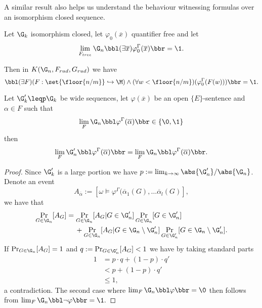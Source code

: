 A similar result also helps us understand the behaviour witnessing formulas over an isomorphism closed sequence.

\begin{thrm}
Let $\G_k$ isomorphism closed, let $\varphi_0(\overline x)$ quantifier free and let 
\[\lim_{F_{tree}}\G_n\bbl(\exists \overline x)\varphi_0^\Gamma(\overline x)\bbr=\1.\]

Then in $K(\G_n,F_{rud},G_{rud})$ we have
\[\bbl(\exists F)(F:\set{\floor{n/m}}\hookrightarrow\M)\land(\forall w<\floor{n/m})(\varphi_0^\Gamma(F(w)))\bbr=\1.\]

\end{thrm}



\begin{lemm}\label{lemmhere}
Let $\G_k'\leqp \G_k$ be wide sequences, let $\varphi(\overline x)$ be an open $\{E\}$-sentence and $\alpha\in F$ such that
\[\lim_{F}\G_n\bbl\varphi^\Gamma(\overline \alpha)\bbr\in\{\0,\1\}\]
then
\[\lim_{F}\G_n'\bbl\varphi^\Gamma(\overline \alpha)\bbr = \lim_{F}\G_n\bbl\varphi^\Gamma(\overline \alpha)\bbr.\]
\end{lemm}
\begin{proof} Since $\G_k'$ is a large portion we have $p:=\lim_{k\to\infty}\abs{\G_n'}/\abs{\G_n}$. Denote an event
\[A_{\overline \alpha}:=[\omega \models \varphi^{\Gamma}(\overline\alpha_1(G),\dots\overline \alpha_l(G)],\]
we have that 
\begin{align}
\Pr_{G\in\G_n}[A_G]&=\Pr_{G\in \G_n}[A_G|G\in\G_n']\Pr_{G\in\G_n}[G\in\G_n']\\
&\phantom{\:=\:}+\Pr_{G\in\G_n}[A_G|G\in\G_n\setminus\G_n']\Pr_{G\in\G_n'}[G\in\G_n \setminus \G_n'].
\end{align}
If $\Pr_{G\in\G_n}[A_G]=1$ and $q:=\Pr_{G\in\G_n'}[A_G]<1$ we have by taking standard parts
\begin{align}
1&=p\cdot q + (1-p)\cdot q'\\
&< p + (1-p)\cdot q'\\
&\leq1,
\end{align}
a contradiction. The second case where $\lim_F\G_n\bbl\varphi\bbr=\0$ then follows from $\lim_F\G_n\bbl\lnot\varphi\bbr=\1.$ 
\end{proof}

